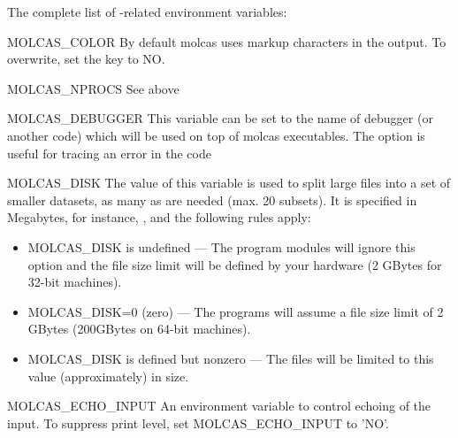 The complete list of \molcas-related environment variables:
\begin{variablelist}
\item[MOLCAS\_COLOR]
By default molcas uses markup characters in the output. To overwrite, set the key to NO.
\item[MOLCAS\_NPROCS]
See above
\item[MOLCAS\_DEBUGGER]
This variable can be set to the name of debugger (or another code) which will be used on top of
molcas executables. The option is useful for tracing an error in the code
\item[MOLCAS\_DISK]
The value of this variable is used to split large files into a set of
smaller datasets, as many as are needed (max. 20 subsets). It is specified
in Megabytes, for instance, ,
and the following rules apply:
\begin{itemize}
\item MOLCAS\_DISK is undefined --- The program modules will ignore this
option and the file size limit will be defined by your hardware
(2 GBytes for 32-bit machines).
\item MOLCAS\_DISK=0 (zero) --- The programs will assume a file size limit
of 2 GBytes (200GBytes on 64-bit machines).
\item MOLCAS\_DISK is defined but nonzero --- The files will be limited to
this value (approximately) in size.
\end{itemize}
\item[MOLCAS\_ECHO\_INPUT]
An environment variable to control echoing of the input.
To suppress print level, set MOLCAS\_ECHO\_INPUT to 'NO'.


\end{variablelist}
